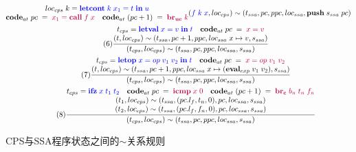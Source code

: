 \begin{figure}[htbp]
\begin{gather*}
{{\begin{matrix}
            loc_{cps}\; k = \textcolor{blue}{\mathbf{letcont}\; k\; x_1=t\; \mathbf{in}\; u}\\
            \mathbf{code}_{at}\; pc\; =\; \textcolor{purple}{x_1 = \mathbf{call}\; f\; x}\quad
            \mathbf{code}_{at}\; (pc+1)\; =\; \textcolor{purple}{\mathbf{br_{uc}}\; k} \end{matrix}}
            {(\textcolor{blue}{f\; k\; x},loc_{cps})\sim (t_{ssa},pc,ppc,loc_{ssa},\mathbf{push}\; s_{ssa}\; pc)}}  \\
        \tag{6} \displaystyle{\frac{\begin{matrix}
            t_{cps} = \textcolor{blue}{\mathbf{letval}\; x=v\; \mathbf{in}\; t} \quad
            \mathbf{code}_{at}\; pc\; =\; \textcolor{purple}{x = v} \\
            (t,loc_{cps})\sim (t_{ssa},pc+1,ppc,loc_{ssa}\; x\mapsto v,s_{ssa}) \end{matrix}}
            {(t_{cps},loc_{cps})\sim (t_{ssa},pc,ppc,loc_{ssa},s_{ssa})}}  \\
        \tag{7} \displaystyle{\frac{\begin{matrix}
            t_{cps} = \textcolor{blue}{\mathbf{letop}\; x=op\; v_1\; v_2\; \mathbf{in}\; t} \quad
            \mathbf{code}_{at}\; pc\; =\; \textcolor{purple}{x = op\; v_1\; v_2} \\
            (t,loc_{cps})\sim (t_{ssa},pc+1,ppc,loc_{ssa}\; x\mapsto (\mathbf{eval}_{exp}\; v_1\; v_2),s_{ssa}) \end{matrix}}
            {(t_{cps},loc_{cps})\sim (t_{ssa},pc,ppc,loc_{ssa},s_{ssa})}}  \\ 
        \tag{8} \displaystyle{\frac{\begin{matrix}
            t_{cps} = \textcolor{blue}{\mathbf{ifz}\; x\; t_1\; t_2} \quad
            \mathbf{code}_{at}\; pc\; =\; \textcolor{purple}{\mathbf{icmp}\; x\; 0} \quad
            \mathbf{code}_{at}\; (pc+1)\; =\; \textcolor{purple}{\mathbf{br_c}\; b_n\; t_n\; f_n} \\
            (t_1,loc_{cps})\sim (t_{ssa},(pc.l_f, t_n, 0),pc,loc_{ssa},s_{ssa}) \\
            (t_2,loc_{cps})\sim (t_{ssa},(pc.l_f, f_n, 0),pc,loc_{ssa},s_{ssa}) \end{matrix}}
            {(t_{cps},loc_{cps})\sim (t_{ssa},pc,ppc,loc_{ssa},s_{ssa})}}  \\          
    \end{gather*}
    \caption{CPS与SSA程序状态之间的$\sim$关系规则}\label{fig:simrelation}
\end{figure}

